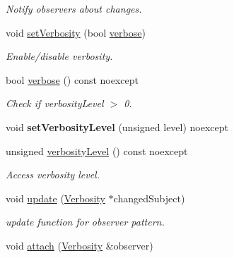 \begin{DoxyCompactItemize}
\begin{DoxyCompactList}\small\item\em Notify observers about changes. \end{DoxyCompactList}\item 
void \hyperlink{classSpacy_1_1Mixin_1_1Verbosity_a0365d293ab27e27da9496c668020aefb}{set\+Verbosity} (bool \hyperlink{classSpacy_1_1Mixin_1_1Verbosity_ad367a7328578546938fd2a7e52ab3793}{verbose})
\begin{DoxyCompactList}\small\item\em Enable/disable verbosity. \end{DoxyCompactList}\item 
\hypertarget{classSpacy_1_1Mixin_1_1Verbosity_ad367a7328578546938fd2a7e52ab3793}{}bool \hyperlink{classSpacy_1_1Mixin_1_1Verbosity_ad367a7328578546938fd2a7e52ab3793}{verbose} () const noexcept\label{classSpacy_1_1Mixin_1_1Verbosity_ad367a7328578546938fd2a7e52ab3793}

\begin{DoxyCompactList}\small\item\em Check if verbosity\+Level $>$ 0. \end{DoxyCompactList}\item 
\hypertarget{classSpacy_1_1Mixin_1_1Verbosity_af84a4b3c933f252a5840ab63d4a38325}{}void {\bfseries set\+Verbosity\+Level} (unsigned level) noexcept\label{classSpacy_1_1Mixin_1_1Verbosity_af84a4b3c933f252a5840ab63d4a38325}

\item 
\hypertarget{classSpacy_1_1Mixin_1_1Verbosity_a2131f495d276c95d2d6534a6dfce6f9f}{}unsigned \hyperlink{classSpacy_1_1Mixin_1_1Verbosity_a2131f495d276c95d2d6534a6dfce6f9f}{verbosity\+Level} () const noexcept\label{classSpacy_1_1Mixin_1_1Verbosity_a2131f495d276c95d2d6534a6dfce6f9f}

\begin{DoxyCompactList}\small\item\em Access verbosity level. \end{DoxyCompactList}\item 
\hypertarget{classSpacy_1_1Mixin_1_1Verbosity_a8cff860c587fcda2cdc86ba744302b33}{}void \hyperlink{classSpacy_1_1Mixin_1_1Verbosity_a8cff860c587fcda2cdc86ba744302b33}{update} (\hyperlink{classSpacy_1_1Mixin_1_1Verbosity_aefe2f237b0456c4bced001fbfa75f92e}{Verbosity} $\ast$changed\+Subject)\label{classSpacy_1_1Mixin_1_1Verbosity_a8cff860c587fcda2cdc86ba744302b33}

\begin{DoxyCompactList}\small\item\em update function for observer pattern. \end{DoxyCompactList}\item 
\hypertarget{classSpacy_1_1Mixin_1_1MixinConnection_abb5520ee6b22dd993d78f142939a1ed4}{}void \hyperlink{classSpacy_1_1Mixin_1_1MixinConnection_abb5520ee6b22dd993d78f142939a1ed4}{attach} (\hyperlink{classSpacy_1_1Mixin_1_1Verbosity_aefe2f237b0456c4bced001fbfa75f92e}{Verbosity} \&observer)\label{classSpacy_1_1Mixin_1_1MixinConnection_abb5520ee6b22dd993d78f142939a1ed4}


\end{DoxyCompactItemize}
